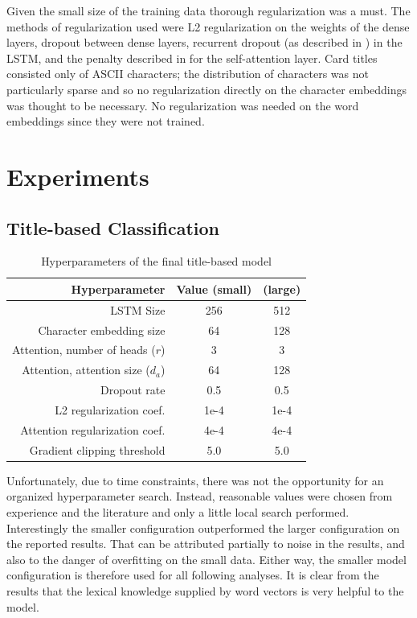 \documentclass[letterpaper]{article} %
\begin{document}
Given the small size of the training data thorough regularization was a must.
The methods of regularization used were
L2 regularization on the weights of the dense layers,
dropout between dense layers,
recurrent dropout (as described in \cite{Gal2016ATG}) in the LSTM,
and the penalty described in \cite{Lin2017ASS} for the self-attention layer.
Card titles consisted only of ASCII characters;
the distribution of characters was not particularly sparse
and so no regularization directly on the character embeddings
was thought to be necessary.
No regularization was needed on the word embeddings since they were not trained.

\section{Experiments}


\subsection{Title-based Classification}

\begin{table}
  \centering
  \caption{Hyperparameters of the final title-based model}
  \begin{tabular}{r | c | c}
    Hyperparameter & Value (small) & (large) \\
    \hline
    LSTM Size & 256 & 512 \\
    Character embedding size & 64 & 128 \\
    Attention, number of heads ($r$) & 3 & 3\\
    Attention, attention size ($d_a$) & 64 & 128\\
    Dropout rate & 0.5 & 0.5 \\
    L2 regularization coef. & 1e-4 & 1e-4 \\
    Attention regularization coef. & 4e-4 & 4e-4 \\
    Gradient clipping threshold & 5.0 & 5.0 \\
  \end{tabular}
\end{table}

Unfortunately,
due to time constraints,
there was not the opportunity for an organized hyperparameter search.
Instead,
reasonable values were chosen from experience and the literature
and only a little local search performed.
Interestingly the smaller configuration outperformed the larger configuration
on the reported results.
That can be attributed partially to noise in the results,
and also to the danger of overfitting on the small data.
Either way,
the smaller model configuration is therefore used for all following analyses.
It is clear from the results that the lexical knowledge supplied by word vectors
is very helpful to the model.
\end{document}

